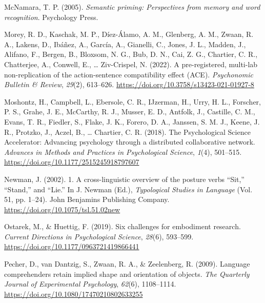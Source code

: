 \documentclass[
  man,floatsintext]{apa7}
\newlength{\cslhangindent}
\newlength{\cslentryspacingunit} %
\newenvironment{CSLReferences}[2] %
 {%
  \setlength{\parindent}{0pt}
  \ifodd #1
  \let\oldpar\par
  \def\par{\hangindent=\cslhangindent\oldpar}
  \fi
  \setlength{\parskip}{#2\cslentryspacingunit}
 }%
 {}
\begin{document}
\begin{CSLReferences}{1}{0}
\leavevmode{}%
McNamara, T. P. (2005). \emph{Semantic {priming}: {Perspectives from memory} and {word recognition}}. {Psychology Press}.

\leavevmode{}%
Morey, R. D., Kaschak, M. P., Díez-Álamo, A. M., Glenberg, A. M., Zwaan, R. A., Lakens, D., Ibáñez, A., García, A., Gianelli, C., Jones, J. L., Madden, J., Alifano, F., Bergen, B., Bloxsom, N. G., Bub, D. N., Cai, Z. G., Chartier, C. R., Chatterjee, A., Conwell, E., \ldots{} Ziv-Crispel, N. (2022). A pre-registered, multi-lab non-replication of the action-sentence compatibility effect (ACE). \emph{Psychonomic Bulletin \& Review}, \emph{29}(2), 613--626. \url{https://doi.org/10.3758/s13423-021-01927-8}

\leavevmode{}%
Moshontz, H., Campbell, L., Ebersole, C. R., IJzerman, H., Urry, H. L., Forscher, P. S., Grahe, J. E., McCarthy, R. J., Musser, E. D., Antfolk, J., Castille, C. M., Evans, T. R., Fiedler, S., Flake, J. K., Forero, D. A., Janssen, S. M. J., Keene, J. R., Protzko, J., Aczel, B., \ldots{} Chartier, C. R. (2018). The {Psychological Science Accelerator}: {Advancing} psychology through a distributed collaborative network. \emph{Advances in Methods and Practices in Psychological Science}, \emph{1}(4), 501--515. \url{https://doi.org/10.1177/2515245918797607}

\leavevmode{}%
Newman, J. (2002). 1. {A} cross-linguistic overview of the posture verbs {``{Sit},''} {``{Stand},''} and {``{Lie}.''} In J. Newman (Ed.), \emph{Typological {Studies} in {Language}} (Vol. 51, pp. 1--24). {John Benjamins Publishing Company}. \url{https://doi.org/10.1075/tsl.51.02new}

\leavevmode{}%
Ostarek, M., \& Huettig, F. (2019). Six challenges for {embodiment research}. \emph{Current Directions in Psychological Science}, \emph{28}(6), 593--599. \url{https://doi.org/10.1177/0963721419866441}

\leavevmode{}%
Pecher, D., van Dantzig, S., Zwaan, R. A., \& Zeelenberg, R. (2009). Language comprehenders retain implied shape and orientation of objects. \emph{The Quarterly Journal of Experimental Psychology}, \emph{62}(6), 1108--1114. \url{https://doi.org/10.1080/17470210802633255}


\end{CSLReferences}
\end{document}
